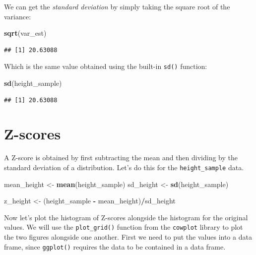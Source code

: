 \documentclass[12pt,]{book}
\newenvironment{Shaded}{\begin{snugshade}}{\end{snugshade}}
\newcommand{\KeywordTok}[1]{\textcolor[rgb]{0.13,0.29,0.53}{\textbf{#1}}}
\newcommand{\NormalTok}[1]{#1}
\newcommand{\OperatorTok}[1]{\textcolor[rgb]{0.81,0.36,0.00}{\textbf{#1}}}
\newcommand{\StringTok}[1]{\textcolor[rgb]{0.31,0.60,0.02}{#1}}
\begin{document}
We can get the \emph{standard deviation} by simply taking the square root of the variance:

\begin{Shaded}
\begin{Highlighting}[]
\KeywordTok{sqrt}\NormalTok{(var_est)}
\end{Highlighting}
\end{Shaded}

\begin{verbatim}
## [1] 20.63088
\end{verbatim}

Which is the same value obtained using the built-in \texttt{sd()} function:

\begin{Shaded}
\begin{Highlighting}[]
\KeywordTok{sd}\NormalTok{(height_sample)}
\end{Highlighting}
\end{Shaded}

\begin{verbatim}
## [1] 20.63088
\end{verbatim}

\hypertarget{z-scores}{%
\section{Z-scores}\label{z-scores}}

A Z-score is obtained by first subtracting the mean and then dividing by the standard deviation of a distribution. Let's do this for the \texttt{height\_sample} data.

\begin{Shaded}
\begin{Highlighting}[]
\NormalTok{mean_height <-}\StringTok{ }\KeywordTok{mean}\NormalTok{(height_sample)}
\NormalTok{sd_height <-}\StringTok{ }\KeywordTok{sd}\NormalTok{(height_sample)}

\NormalTok{z_height <-}\StringTok{ }\NormalTok{(height_sample }\OperatorTok{-}\StringTok{ }\NormalTok{mean_height)}\OperatorTok{/}\NormalTok{sd_height}
\end{Highlighting}
\end{Shaded}

Now let's plot the histogram of Z-scores alongside the histogram for the original values. We will use the \texttt{plot\_grid()} function from the \texttt{cowplot} library to plot the two figures alongside one another. First we need to put the values into a data frame, since \texttt{ggplot()} requires the data to be contained in a data frame.
\end{document}
